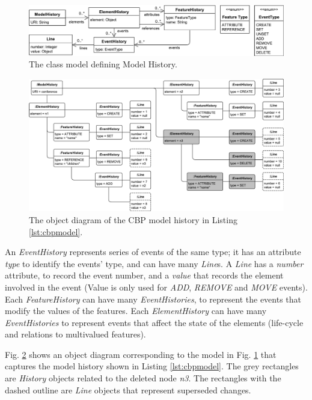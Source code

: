 \documentclass{llncs}
\begin{document}
     \begin{figure}[ht]
\centering
\includegraphics[width=\linewidth]{object_history}
\caption{The class model defining Model History.}
\label{fig:object_history}
    \end{figure}

     \begin{figure}[ht]
\centering
\includegraphics[width=\linewidth]{history_structure}
\caption{The object diagram of the CBP model history in Listing \ref{lst:cbpmodel}.}
\label{fig:history_structure}
    \end{figure}
    
    
    An \emph{EventHistory} represents series of events of the same type; it has an attribute \emph{type} to identify the events' type, and can have many \emph{Line}s.  A \emph{Line} has a \emph{number} attribute, to record the event number, and a \emph{value} that records the element involved in the event (Value is only used for \emph{ADD}, \emph{REMOVE} and \emph{MOVE} events). Each \emph{FeatureHistory} can have many \emph{EventHistories}, to represent the events that modify the values of the features.
    Each \emph{ElementHistory} can have many \emph{EventHistories} to represent events that affect the state of the elements (life-cycle and relations to multivalued features).
    
    Fig. \ref{fig:history_structure} shows an object diagram corresponding to the model in Fig. \ref{fig:object_history} that captures the model history shown in Listing \ref{lst:cbpmodel}. The grey rectangles are \emph{History} objects related to the deleted node \emph{n3}. The rectangles with the dashed outline are \emph{Line} objects that represent superseded changes. 
      
\end{document}
